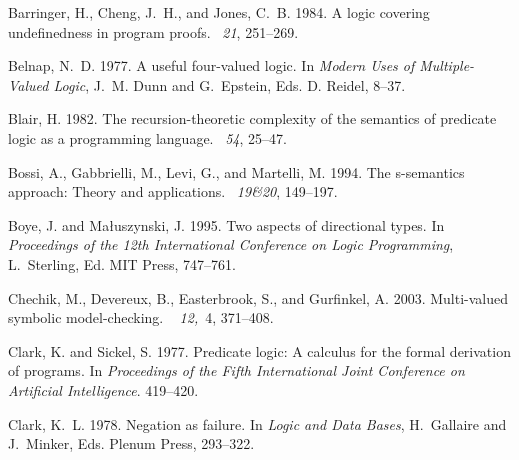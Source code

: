 \documentclass{tlp}
\begin{document}
\begin{thebibliography}{}
{\sc Barringer, H.}, {\sc Cheng, J.~H.}, {\sc and} {\sc Jones, C.~B.} 1984.
\newblock A logic covering undefinedness in program proofs.
~{\em 21}, 251--269.

{\sc Belnap, N.~D.} 1977.
\newblock A useful four-valued logic.
\newblock In {\em Modern Uses of Multiple-Valued Logic}, {J.~M. Dunn} {and}
  {G.~Epstein}, Eds. D. Reidel, 8--37.

{\sc Blair, H.} 1982.
\newblock The recursion-theoretic complexity of the semantics of predicate
  logic as a programming language.
~{\em 54}, 25--47.

{\sc Bossi, A.}, {\sc Gabbrielli, M.}, {\sc Levi, G.}, {\sc and} {\sc Martelli,
  M.} 1994.
\newblock The s-semantics approach: Theory and applications.
~{\em 19\&20}, 149--197.

{\sc Boye, J.} {\sc and} {\sc Ma{\l}uszynski, J.} 1995.
\newblock Two aspects of directional types.
\newblock In {\em Proceedings of the 12th International Conference on Logic
  Programming}, {L.~Sterling}, Ed. MIT Press, 747--761.

{\sc Chechik, M.}, {\sc Devereux, B.}, {\sc Easterbrook, S.}, {\sc and} {\sc
  Gurfinkel, A.} 2003.
\newblock Multi-valued symbolic model-checking.
~{\em
  12,\/}~4, 371--408.

{\sc Clark, K.} {\sc and} {\sc Sickel, S.} 1977.
\newblock Predicate logic: A calculus for the formal derivation of programs.
\newblock In {\em Proceedings of the Fifth International Joint Conference on
  Artificial Intelligence}. 419--420.

{\sc Clark, K.~L.} 1978.
\newblock Negation as failure.
\newblock In {\em Logic and Data Bases}, {H.~Gallaire} {and} {J.~Minker}, Eds.
  Plenum Press, 293--322.


\end{thebibliography}
\end{document}
